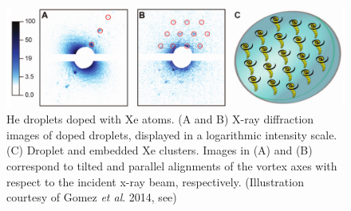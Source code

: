 	\begin{figure}[t]
		\begin{center}
			\includegraphics[width=\textwidth]{vortex-array}
			\caption{He droplets doped with Xe atoms. (A and B) X-ray diffraction images of doped droplets, displayed in a logarithmic intensity scale. (C) Droplet and embedded Xe clusters. Images in (A) and (B) correspond to tilted and parallel alignments of the vortex axes with respect to the incident x-ray beam, respectively. (Illustration courtesy of Gomez \emph{et al}. 2014, see)}
			\label{fig:vortex-array}
		\end{center}
	\end{figure}
\clearpage{\pagestyle{empty}\cleardoublepage}